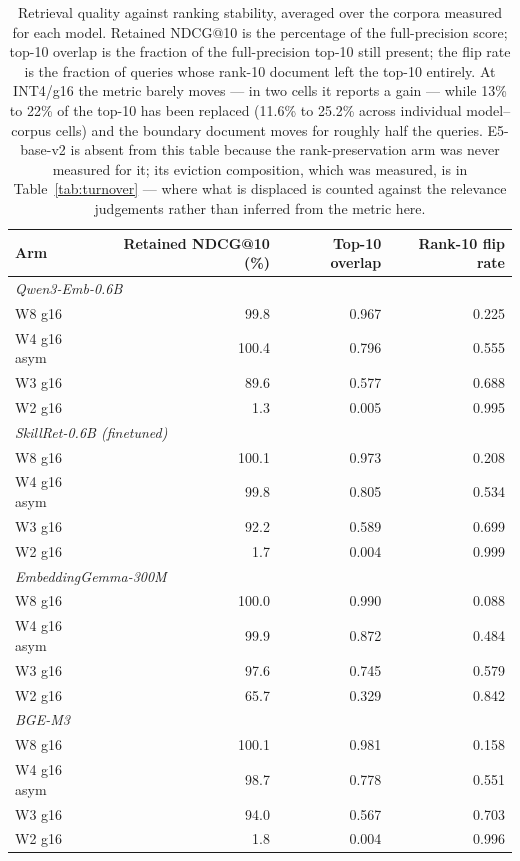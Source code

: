 \begin{table}[t]\centering\small
\caption{Retrieval quality against ranking stability, averaged over the corpora measured for
each model. Retained NDCG@10 is the percentage of the full-precision score; top-10 overlap is
the fraction of the full-precision top-10 still present; the flip rate is the fraction of
queries whose rank-10 document left the top-10 entirely. At INT4/g16 the metric barely moves
--- in two cells it reports a gain --- while 13\% to 22\% of the top-10 has been replaced
(11.6\% to 25.2\% across individual model--corpus cells) and the boundary document moves for
roughly half the queries. E5-base-v2 is absent from this table because the rank-preservation
arm was never measured for it; its eviction composition, which was
measured, is in Table~\ref{tab:turnover} --- where what is displaced is counted against the
relevance judgements rather than inferred from the metric here.}
\label{tab:rank}
\begin{tabular}{lrrr}
\toprule
Arm & Retained NDCG@10 (\%) & Top-10 overlap & Rank-10 flip rate \\
\midrule
\multicolumn{4}{l}{\emph{Qwen3-Emb-0.6B}} \\
\quad W8 g16 & 99.8 & 0.967 & 0.225 \\
\quad W4 g16 asym & 100.4 & 0.796 & 0.555 \\
\quad W3 g16 & 89.6 & 0.577 & 0.688 \\
\quad W2 g16 & 1.3 & 0.005 & 0.995 \\
\multicolumn{4}{l}{\emph{SkillRet-0.6B (finetuned)}} \\
\quad W8 g16 & 100.1 & 0.973 & 0.208 \\
\quad W4 g16 asym & 99.8 & 0.805 & 0.534 \\
\quad W3 g16 & 92.2 & 0.589 & 0.699 \\
\quad W2 g16 & 1.7 & 0.004 & 0.999 \\
\multicolumn{4}{l}{\emph{EmbeddingGemma-300M}} \\
\quad W8 g16 & 100.0 & 0.990 & 0.088 \\
\quad W4 g16 asym & 99.9 & 0.872 & 0.484 \\
\quad W3 g16 & 97.6 & 0.745 & 0.579 \\
\quad W2 g16 & 65.7 & 0.329 & 0.842 \\
\multicolumn{4}{l}{\emph{BGE-M3}} \\
\quad W8 g16 & 100.1 & 0.981 & 0.158 \\
\quad W4 g16 asym & 98.7 & 0.778 & 0.551 \\
\quad W3 g16 & 94.0 & 0.567 & 0.703 \\
\quad W2 g16 & 1.8 & 0.004 & 0.996 \\
\bottomrule
\end{tabular}\end{table}